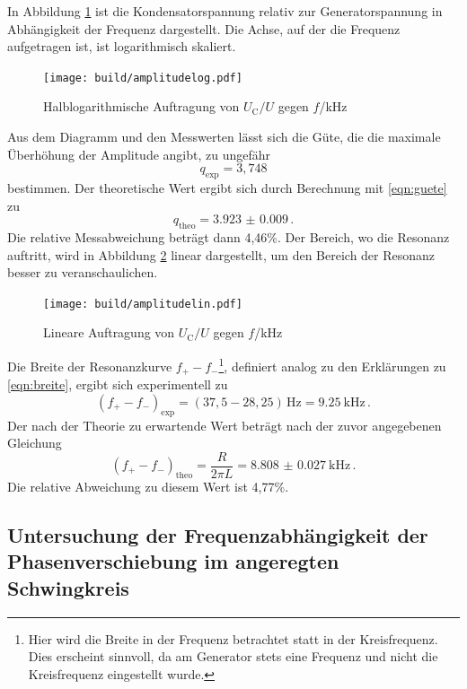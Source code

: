 In Abbildung \ref{fig:amplitudelog} ist die Kondensatorspannung relativ
zur Generatorspannung in Abhängigkeit der Frequenz dargestellt. Die Achse, auf der
die Frequenz aufgetragen ist, ist logarithmisch skaliert.

\begin{figure}
  \centering
  \texttt{[image: build/amplitudelog.pdf]}
  \caption{Halblogarithmische Auftragung von $U_\text{C}/U$ gegen $f$/kHz}
  \label{fig:amplitudelog}
\end{figure}

Aus dem Diagramm und den Messwerten lässt sich die Güte, die die maximale
Überhöhung der Amplitude angibt, zu ungefähr
\begin{equation*}
  q_\text{exp} = 3,748
\end{equation*}
bestimmen. Der theoretische Wert ergibt sich durch Berechnung mit \eqref{eqn:guete}
zu
\begin{equation*}
  q_\text{theo} = \SI{3.923(0009)}\,.
\end{equation*}
Die relative Messabweichung beträgt dann 4,46\%.
Der Bereich, wo die Resonanz auftritt, wird in Abbildung \ref{fig:amplitudelin}
linear dargestellt, um den Bereich der Resonanz besser zu veranschaulichen.

\begin{figure}
  \centering
  \texttt{[image: build/amplitudelin.pdf]}
  \caption{Lineare Auftragung von $U_\text{C}/U$ gegen $f$/kHz}
  \label{fig:amplitudelin}
\end{figure}

Die Breite der Resonanzkurve $f_{+} - f_{-}$\footnote{Hier wird die Breite in der
Frequenz betrachtet statt in der Kreisfrequenz. Dies erscheint sinnvoll, da am
Generator stets eine Frequenz und nicht die Kreisfrequenz eingestellt wurde.},
definiert analog zu den Erklärungen zu \eqref{eqn:breite}, ergibt sich experimentell zu
\begin{equation*}
  (f_{+} - f_{-})_\text{exp} = (37,5-28,25)\,\text{Hz} = \SI{9.25}{\kilo\hertz}\,.
\end{equation*}
Der nach der Theorie zu erwartende Wert beträgt nach der zuvor angegebenen Gleichung
\begin{equation*}
  (f_{+} - f_{-})_\text{theo} = \frac{R}{2\pi L} = \SI{8.808(27)}{\kilo\hertz}\,.
\end{equation*}
Die relative Abweichung zu diesem Wert ist 4,77\%.

\subsection{Untersuchung der Frequenzabhängigkeit der Phasenverschiebung im angeregten Schwingkreis}
